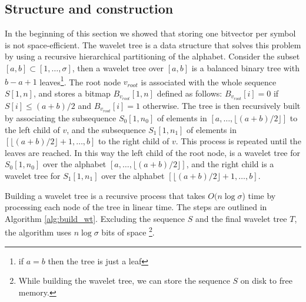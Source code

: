 \subsection{Structure and construction}

In the beginning of this section we showed that storing one bitvector per symbol is not space-efficient. The wavelet tree is a data structure that solves this problem by using a recursive hierarchical partitioning of the alphabet. Consider the subset $[a,b] \subset [1, \dots, \sigma]$, then a wavelet tree over $[a,b]$ is a balanced binary tree with $b-a+1$ leaves\footnote{if $a=b$ then the tree is just a leaf}. The root node $v_{root}$ is associated with the whole sequence $S[1,n]$, and stores a bitmap $B_{v_{root}}[1,n]$ defined as follows: $B_{v_{root}}[i] = 0$ if $S[i] \leq (a+b)/2$ and $B_{v_{root}}[i] = 1$ otherwise. The tree is then recursively built by associating the subsequence $S_0[1,n_0]$ of elements in $[a, \dots,\lfloor (a+b)/2 \rfloor ]$ to the left child of $v$, and the subsequence $S_1[1,n_1]$ of elements in $[\lfloor (a+b)/2 \rfloor +1,\dots, b]$ to the right child of $v$. This process is repeated until the leaves are reached. In this way the left child of the root node, is a wavelet tree for $S_0[1,n_0]$ over the alphabet $[a,\dots, \lfloor (a+b)/2 \rfloor ]$, and the right child is a wavelet tree for $S_1[1,n_1]$ over the alphabet $[\lfloor (a+b)/2 \rfloor +1,\dots, b]$. \cite{WTForALL}

\noindent Building a wavelet tree is a recursive process that takes $O(n\log \sigma$) time by processing each node of the tree in linear time. The steps are outlined in Algorithm \ref{alg:build_wt}. Excluding the sequence $S$ and the final wavelet tree $T$, the algorithm uses $n \log \sigma$ bits of space \footnote{While building the wavelet tree, we can store the sequence $S$ on disk to free memory.}.

